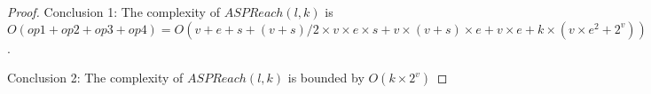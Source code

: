 \begin{theorem}
\begin{proof}
        Conclusion 1: The complexity of $ASPReach(l,k)$ is $O(op1 + op2 + op3 + op4) = O(v + e + s + (v+s) / 2  \times v \times e \times s + v \times (v+s) \times e + v \times e + k \times (v \times e^{2} + 2^{v}))$.
        
        Conclusion 2: The complexity of $ASPReach(l,k)$ is bounded by $O(k \times 2^{v})$
    \end{proof}
\end{theorem}
